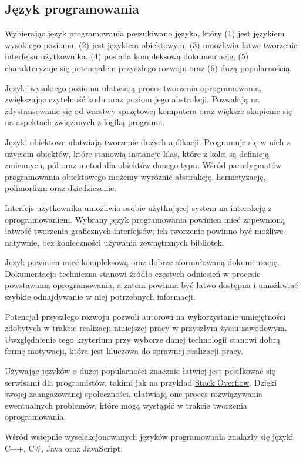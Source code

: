 \documentclass[skorowidz,skroty]{dyplomWEZUT}
\begin{document}
\subsection{Język programowania}
Wybierając język programowania poszukiwano języka, który (1) jest językiem wysokiego poziomu, (2) jest językiem obiektowym, (3) umożliwia łatwe tworzenie interfejsu użytkownika, (4) posiada kompleksową dokumentację, (5) charakteryzuje się potencjałem przyszłego rozwoju oraz (6) dużą popularnością. 

Języki wysokiego poziomu ułatwiają proces tworzenia oprogramowania, zwiększając czytelność kodu oraz poziom jego abstrakcji. Pozwalają na zdystansowanie się od warstwy sprzętowej komputera oraz większe skupienie się na aspektach związanych z logiką programu.

Języki obiektowe ułatwiają tworzenie dużych aplikacji. Programuje się w nich z użyciem obiektów, które stanowią instancje klas, które z kolei są definicją zmiennych, pól oraz metod dla obiektów danego typu. Wśród paradygmatów programowania obiektowego możemy wyróżnić abstrakcję, hermetyzację, polimorfizm oraz dziedziczenie.

Interfejs użytkownika umożliwia osobie użytkującej system na interakcję z oprogramowaniem. Wybrany język programowania powinien mieć zapewnioną łatwość tworzenia graficznych interfejsów; ich tworzenie powinno być możliwe natywnie, bez konieczności używania zewnętrznych bibliotek. 

Język powinien mieć kompleksową oraz dobrze sformułowaną dokumentację. Dokumentacja techniczna stanowi źródło częstych odniesień w procesie powstawania oprogramowania, a zatem powinna być łatwo dostępna i umożliwiać szybkie odnajdywanie w niej potrzebnych informacji.

Potencjał przyszłego rozwoju pozwoli autorowi na wykorzystanie umiejętności zdobytych w trakcie realizacji niniejszej pracy w przyszłym życiu zawodowym. Uwzględnienie tego kryterium przy wyborze danej technologii stanowi dobrą formę motywacji, która jest kluczowa do sprawnej realizacji pracy.

Używając języków o dużej popularności znacznie łatwiej jest posiłkować się serwisami dla programistów, takimi jak na przykład \href{www.stackoverflow.com}{Stack Overflow}. Dzięki swojej zaangażowanej społeczności, ułatwiają one proces rozwiązywania ewentualnych problemów, które mogą wystąpić w trakcie tworzenia oprogramowania.

Wśród wstępnie wyselekcjonowanych języków programowania znalazły się języki C++, C\#, Java oraz JavaScript.
\end{document}
